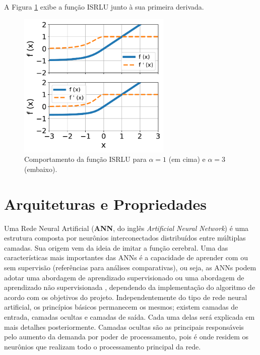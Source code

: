 A Figura \ref{fig:ann_isrlu_function} exibe a função ISRLU \citep{carlile2017improving} junto à sua primeira derivada.

\begin{figure}[H]
    \centering
    \includegraphics[width=0.65\textwidth]{figs/ann_isrlu_function.pdf}

    \caption{Comportamento da função ISRLU para $\alpha=1$ (em cima) e $\alpha=3$ (embaixo).}
    \label{fig:ann_isrlu_function}
\end{figure}


\linebreak
\newpage


\section{Arquiteturas e Propriedades}
\label{sec:ann_arch_and_prop}

Uma Rede Neural Artificial (\textbf{ANN}, do inglês \textit{Artificial Neural Network}) é uma estrutura composta por neurônios interconectados distribuídos entre múltiplas camadas. Sua origem vem da ideia de imitar a função cerebral. Uma das características mais importantes das ANNs é a capacidade de aprender com ou sem supervisão (referências para análises comparativas), ou seja, as ANNs podem adotar uma abordagem de aprendizado supervisionado ou uma abordagem de aprendizado não supervisionada \citep{haykin1999neural}, dependendo da implementação do algoritmo de acordo com os objetivos do projeto. Independentemente do tipo de rede neural artificial, os princípios básicos permanecem os mesmos; existem camadas de entrada, camadas ocultas e camadas de saída. Cada uma delas será explicada em mais detalhes posteriormente. Camadas ocultas são as principais responsáveis pelo aumento da demanda por poder de processamento, pois é onde residem os neurônios que realizam todo o processamento principal da rede.

